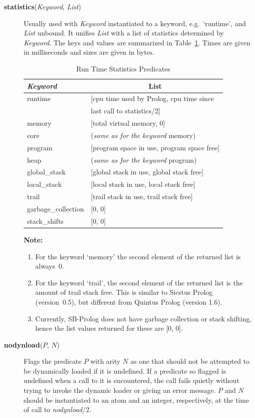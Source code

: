 \begin{description}
\item[{\bf statistics}({\em Keyword}, {\em List})]
    Usually used with {\em Keyword} instantiated to a keyword,
    e.g.\ `runtime', and {\em List} unbound.
    It unifies {\em List} with a list of statistics determined by {\em Keyword}.
    The keys and values are summarized in Table~\ref{statistics}.
    Times are given in milliseconds and sizes are given in bytes.
\begin{table}[htbp]{\centering
\begin{tabular}{|l|l|}
\hline
{\em Keyword}&\multicolumn{1}{c|}{List}\\ \hline\hline
runtime & {[cpu time used by Prolog, cpu time since}\\
 & 	 last call to statistics/2]\\
memory & {[total virtual memory, 0]}\\
core & ({\em same as for the keyword} memory)\\
program & {[program space in use, program space free]}\\
heap &	 ({\em same as for the keyword} program)\\
global\_stack & {[global stack in use, global stack free]}\\
local\_stack & {[local stack in use, local stack free]}\\
trail &	 {[trail stack in use, trail stack free]}\\
garbage\_collection & {[0, 0]}\\
stack\_shifts & {[0, 0]} \\
\hline
\end{tabular}
\caption{Run Time Statistics Predicates}}\label{statistics}
{\bf Note:}
\begin{enumerate}
\item For the keyword `memory' the second element of the returned list
    is always~0.
\item For the keyword `trail', the second element of the returned list is the
    amount of trail stack free.
    This is similar to Sicstus Prolog (version~0.5),
    but different from Quintus Prolog (version 1.6).
\item Currently, SB-Prolog does not have garbage collection or stack shifting,
    hence the list values returned for these are [0, 0].
\end{enumerate}
\end{table}

\item[{\bf nodynload}($P$, $N$)]
    Flags the predicate $P$ with arity $N$ as one that should not be
    attempted to be dynamically loaded if it is undefined.
    If a predicate so flagged is undefined when a call to it is encountered,
    the call fails quietly without trying to invoke the dynamic loader
    or giving an error message.
    $P$ and $N$ should be instantiated to an atom and an
    integer, respectively, at the time of call to {\em nodynload}/2.


\end{description}
